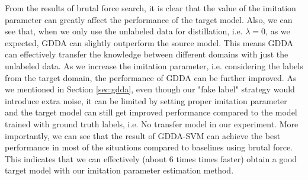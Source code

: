 From the results of brutal force search, it is clear that the value of the imitation parameter can greatly affect the performance of the target model.
Also, we can see that, when we only use the unlabeled data for distillation, i.e. $\lambda = 0$, as we expected, GDDA can slightly outperform the source model. This means GDDA can effectively transfer the knowledge between different domains with just the unlabeled data. As we increase the imitation parameter, i.e. considering the labels from the target domain, the performance of GDDA can be further improved. As we mentioned in Section \ref{sec:gdda}, even though our "fake label" strategy would introduce extra noise, it can be limited by setting proper imitation parameter and the target model can still get improved performance compared to the model trained with ground truth labels, i.e. No transfer model in our experiment.
More importantly, we can see that the result of GDDA-SVM can achieve the best performance in most of the situations compared to baselines using brutal force. This indicates that we can effectively (about 6 times times faster) obtain a good target model with our imitation parameter estimation method.
